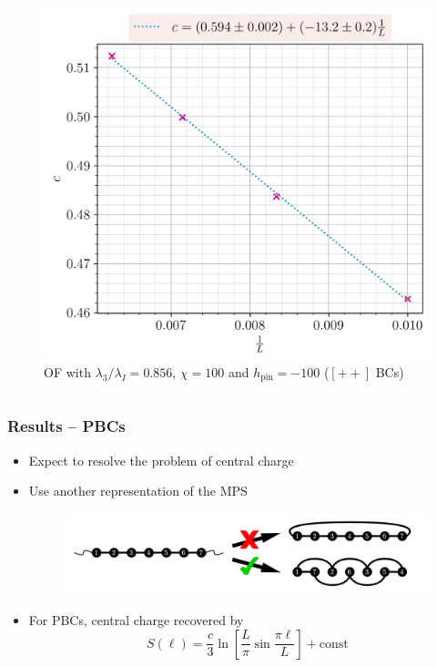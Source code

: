 \documentclass[10pt]{beamer}
\begin{document}
\begin{frame}
\begin{columns}
        \pause
        \begin{column}{0.6\linewidth}
            \begin{figure}
                \includegraphics[scale=0.43]{../../graphs/entropies/--/100/calabrese_J=1.0_h=1.0_i=1.0_3=0.856_c=0.0.png}
                \caption{OF with $\lambda_3/\lambda_I = 0.856$, $\chi=100$ and $h_\text{pin} = -100$ ($[++]$ BCs)}
            \end{figure}
        \end{column}
    \end{columns}
\end{frame}

\begin{frame}
    \frametitle{Results -- PBCs}

        \begin{itemize}
            \item Expect to resolve the problem of central charge
            \pause
            \item Use another representation of the MPS 
                \begin{figure}
                    \hspace{-1cm}
                    \includegraphics[scale=0.25]{../../images/pbcmps.png}
                \end{figure}
            \pause
            \item For PBCs, central charge recovered by $$S(\ell) = \frac{c}{3} \ln\left[\frac{L}{\pi} \sin \frac{\pi \ell}{L} \right] + \text{const}$$
        \end{itemize}
\end{frame}
\end{document}

